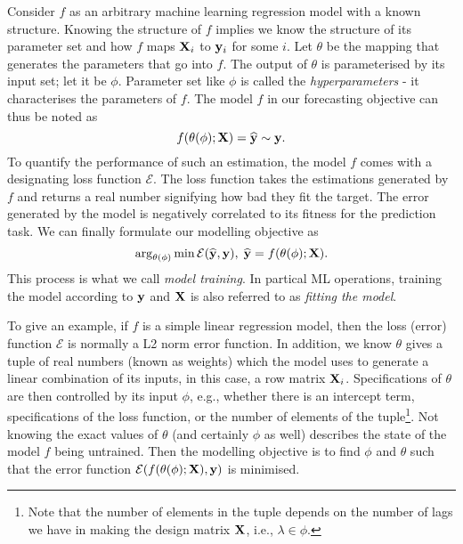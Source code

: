 Consider $f$ as an arbitrary machine learning regression model with a known structure. Knowing the structure of $f$ implies we know the structure of its parameter set and how $f$ maps $\mathbf{X}_i$ to $\mathbf{y}_i$ for some $i$. Let $\theta$ be the mapping that generates the parameters that go into $f$. The output of $\theta$ is parameterised by its input set; let it be $\phi$. Parameter set like $\phi$ is called the \textit{hyperparameters} - it characterises the parameters of $f$. The model $f$ in our forecasting objective can thus be noted as
\begin{equation*}
    f(\theta(\phi); \mathbf{X}) = \widehat{\mathbf{y}} \sim \mathbf{y}.
\end{equation*}
To quantify the performance of such an estimation, the model $f$ comes with a designating loss function $\mathcal{E}$. The loss function takes the estimations generated by $f$ and returns a real number signifying how bad they fit the target. The error generated by the model is negatively correlated to its fitness for the prediction task. We can finally formulate our modelling objective as
\begin{equation}\label{eq: ml training}
    \arg_{\theta(\phi)} \min \mathcal{E}(\widehat{\mathbf{y}}, \mathbf{y}), \; \widehat{\mathbf{y}} = f(\theta(\phi); \mathbf{X}).
\end{equation}
This process is what we call \textit{model training}. In partical ML operations, training the model according to $\mathbf{y}$ and $\mathbf{X}$ is also referred to as \textit{fitting the model}.

To give an example, if $f$ is a simple linear regression model, then the loss (error) function $\mathcal{E}$ is normally a L2 norm error function. In addition, we know $\theta$ gives a tuple of real numbers (known as weights) which the model uses to generate a linear combination of its inputs, in this case, a row matrix $\mathbf{X}_i$. Specifications of $\theta$ are then controlled by its input $\phi$, e.g., whether there is an intercept term, specifications of the loss function, or the number of elements of the tuple\footnote{Note that the number of elements in the tuple depends on the number of lags we have in making the design matrix $\mathbf{X}$, i.e., $\lambda \in \phi$.}. Not knowing the exact values of $\theta$ (and certainly $\phi$ as well) describes the state of the model $f$ being untrained. Then the modelling objective is to find $\phi$ and $\theta$ such that the error function $\mathcal{E}(f(\theta(\phi); \mathbf{X}), \mathbf{y})$ is minimised.

